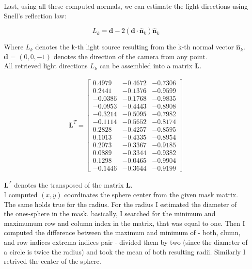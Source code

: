 \documentclass{paper}
\begin{document}
Last, using all these computed normals, we can estimate the light directions using Snell's reflection law:

\begin{equation}
    L_k = \textbf{d}-2(\textbf{d}\cdot \hat{\textbf{n}}_k)\hat{\textbf{n}}_k
\label{eq:snell_reflection}
\end{equation}

Where $L_k$ denotes the k-th light source resulting from the k-th normal vector $\hat{\textbf{n}}_k$.  \textbf{d} = $(0,0,-1)$ denotes the direction of the camera from any point.\\

All retrieved light directions $L_k$ can be assembled into a matrix $\mathbf{L}$. 

\begin{align}
\mathbf{L}^T= \left[ \begin{array}{ccc}
    0.4979 &  -0.4672 &  -0.7306 \\
    0.2441 &  -0.1376 &  -0.9599 \\
   -0.0386 &  -0.1768 &  -0.9835 \\
   -0.0953 &  -0.4443 &  -0.8908 \\
   -0.3214 &  -0.5095 &  -0.7982 \\
   -0.1114 &  -0.5652 &  -0.8174 \\
    0.2828 &  -0.4257 &  -0.8595 \\
    0.1013 &  -0.4335 &  -0.8954 \\
    0.2073 &  -0.3367 &  -0.9185 \\
    0.0889 &  -0.3344 &  -0.9382 \\
    0.1298 &  -0.0465 &  -0.9904 \\
   -0.1446 &  -0.3644 &  -0.9199
\end{array} \right] \nonumber
\end{align}

$\mathbf{L}^T$ denotes the transposed of the matrix $\mathbf{L}$. \\

I computed $(x,y)$ coordinates the sphere center from the given mask matrix. The same holds true for the radius. For the radius I estimated the diameter of the ones-sphere in the mask. basically, I searched for the minimum and maximumum row and column index in the matrix, that was equal to one. Then I computed the difference between the maximum and minimum of - both, clumn, and row indices extrema indices pair - divided them by two (since the diameter of a circle is twice the radius) and took the mean of both resulting radii. Similarly I retrived the center of the sphere. \\
\end{document}
